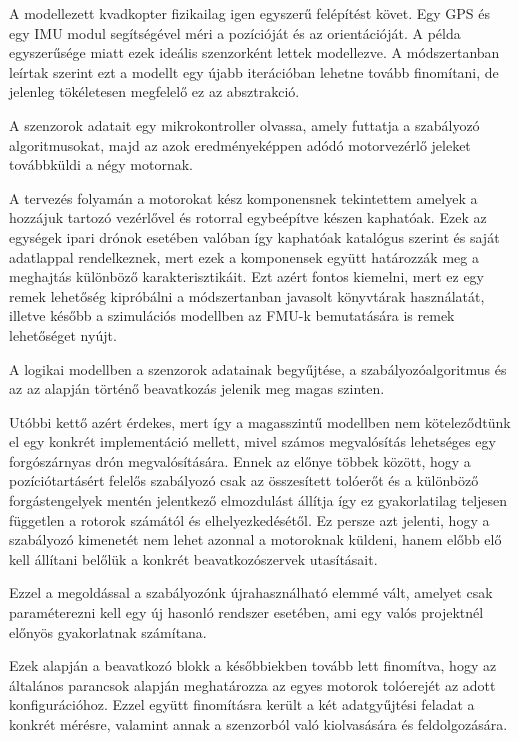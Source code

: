     A modellezett kvadkopter fizikailag igen egyszerű felépítést követ. Egy GPS és egy IMU modul segítségével méri a pozícióját és az orientációját. A példa egyszerűsége miatt ezek ideális szenzorként lettek modellezve.
    A módszertanban leírtak szerint ezt a modellt egy újabb iterációban lehetne tovább finomítani, de jelenleg tökéletesen megfelelő ez az absztrakció.
    
    A szenzorok adatait egy mikrokontroller olvassa, amely futtatja a szabályozó algoritmusokat, majd az azok eredményeképpen adódó motorvezérlő jeleket továbbküldi a négy motornak.
    
    A tervezés folyamán a motorokat kész komponensnek tekintettem amelyek a hozzájuk tartozó vezérlővel és rotorral egybeépítve készen kaphatóak. Ezek az egységek ipari drónok esetében valóban így kaphatóak katalógus szerint és saját adatlappal rendelkeznek, mert ezek a komponensek együtt határozzák meg a meghajtás különböző karakterisztikáit.
    Ezt azért fontos kiemelni, mert ez egy remek lehetőség kipróbálni a módszertanban javasolt könyvtárak használatát, illetve később a szimulációs modellben az FMU-k bemutatására is remek lehetőséget nyújt.
    
    A logikai modellben a szenzorok adatainak begyűjtése, a szabályozóalgoritmus és az az alapján történő beavatkozás jelenik meg magas szinten.
    
    Utóbbi kettő azért érdekes, mert így a magasszintű modellben nem köteleződtünk el egy konkrét implementáció mellett, mivel számos megvalósítás lehetséges egy forgószárnyas drón megvalósítására. Ennek az előnye többek között, hogy a pozíciótartásért felelős szabályozó csak az összesített tolóerőt és a különböző forgástengelyek mentén jelentkező elmozdulást állítja így ez gyakorlatilag teljesen független a rotorok számától és elhelyezkedésétől.
    Ez persze azt jelenti, hogy a szabályozó kimenetét nem lehet azonnal a motoroknak küldeni, hanem előbb elő kell állítani belőlük a konkrét beavatkozószervek utasításait.
    
    Ezzel a megoldással a szabályozónk újrahasználható elemmé vált, amelyet csak paraméterezni kell egy új hasonló rendszer esetében, ami egy valós projektnél előnyös gyakorlatnak számítana.
    
    Ezek alapján a beavatkozó blokk a későbbiekben tovább lett finomítva, hogy az általános parancsok alapján meghatározza az egyes motorok tolóerejét az adott konfigurációhoz. 
    Ezzel együtt finomításra került a két adatgyűjtési feladat a konkrét mérésre, valamint annak a szenzorból való kiolvasására és feldolgozására.
    
